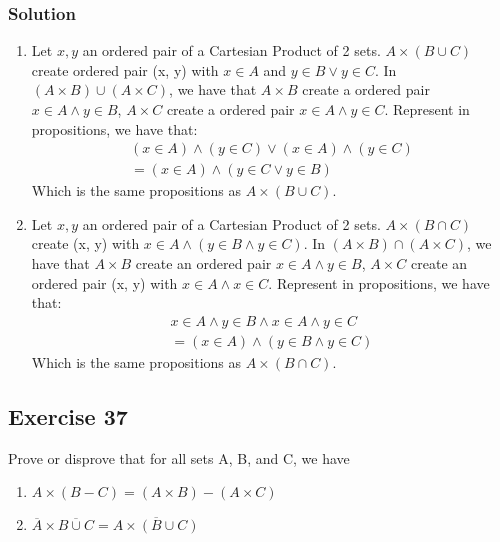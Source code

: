 \documentclass{article}
\theoremstyle{mytheoremstyle}
\theoremstyle{mytheoremstyle}
\theoremstyle{myproblemstyle}
\begin{document}
    \subsubsection*{Solution}
        \begin{enumerate} [label = (\alph*)]
            \item Let \(x, y\) an ordered pair of a Cartesian Product of 2 sets. \(A \times (B \cup C)\) create ordered pair
            (x, y) with \(x \in A\) and \(y \in B \lor y \in C\). In \((A \times B) \cup (A \times C)\), we have that 
            \(A \times B\) create a ordered pair \(x \in A \land y \in B\), \(A \times C\) create a ordered pair
            \(x \in A \land y \in C\). Represent in propositions, we have that:
            \begin{align*}
                (x \in A) \land (y \in C) \lor (x \in A )\land (y \in C)\\
                = (x \in A) \land (y \in C \lor y \in B)
            \end{align*}
            Which is the same propositions as \(A \times (B \cup C)\).
            \item Let \(x, y\) an ordered pair of a Cartesian Product of 2 sets. \(A \times (B \cap C)\) create
            (x, y) with \(x \in A \land (y \in B \land y \in C)\). In \((A \times B) \cap (A \times C)\), we have that
            \(A \times B\) create an ordered pair \(x \in A \land y \in B\), \(A \times C\) create an ordered pair
            (x, y) with \(x \in A \land x \in C\). Represent in propositions, we have that:
            \begin{align*}
                x \in A \land y \in B \land x \in A \land y \in C\\
                = (x \in A) \land (y \in B \land y \in C)
            \end{align*} 
            Which is the same propositions as \(A \times (B \cap C)\).
        \end{enumerate}
    \subsection*{Exercise 37}
        Prove or disprove that for all sets A, B, and C, we have
        \begin{enumerate} [label = (\alph*)]
            \item \(A \times (B - C) = (A \times B) - (A \times C)\)
            \item \(\overline{A} \times \overline{B \cup C} = \overline{A \times (B \cup C)}\)
        \end{enumerate}
\end{document}
